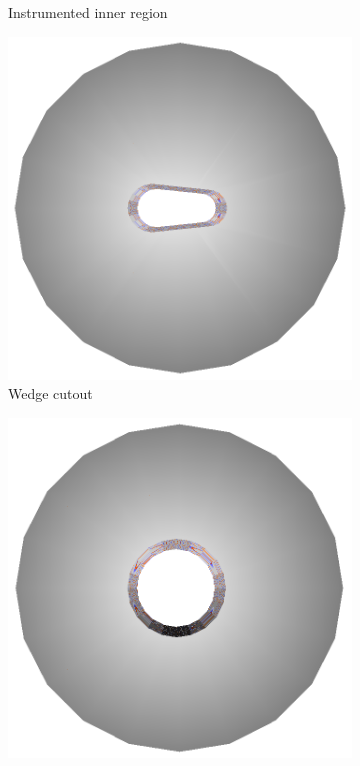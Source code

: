 \begin{itemize}
\begin{figure}
\begin{subfigure}[b]{0.3\textwidth}
   \caption{Instrumented inner region}
  \end{subfigure}
  \begin{subfigure}[b]{0.3\textwidth}
   \centering
    \includegraphics[width=\textwidth]{Figures/beamcal_wedge.png}
   \caption{Wedge cutout}
   \end{subfigure}
    \begin{subfigure}[b]{0.3\textwidth}
   \centering
    \includegraphics[width=\textwidth]{Figures/beamcal_circle.png}

\end{subfigure}
\end{figure}
\end{itemize}
